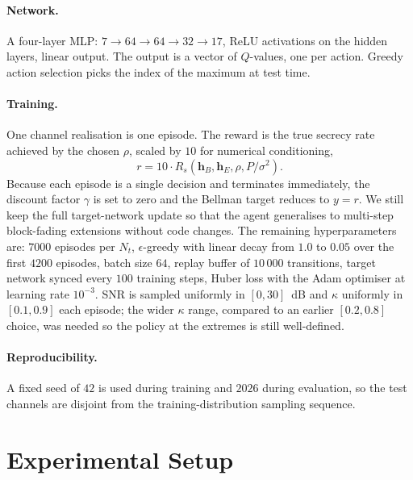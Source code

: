 \documentclass[conference]{IEEEtran}
\begin{document}
\paragraph{Network.} A four-layer MLP:
$7 \to 64 \to 64 \to 32 \to 17$, ReLU activations on the hidden
layers, linear output. The output is a vector of $Q$-values, one per
action. Greedy action selection picks the index of the maximum at
test time.

\paragraph{Training.} One channel realisation is one episode. The
reward is the true secrecy rate achieved by the chosen $\rho$, scaled
by $10$ for numerical conditioning,
\begin{equation}
r = 10 \cdot R_s(\mathbf{h}_B, \mathbf{h}_E, \rho, P/\sigma^2).
\end{equation}
Because each episode is a single decision and terminates immediately,
the discount factor $\gamma$ is set to zero and the Bellman target
reduces to $y = r$. We still keep the full target-network update so
that the agent generalises to multi-step block-fading extensions
without code changes. The remaining hyperparameters are: $7000$
episodes per $N_t$, $\epsilon$-greedy with linear decay from $1.0$ to
$0.05$ over the first $4200$ episodes, batch size $64$, replay buffer
of $10\,000$ transitions, target network synced every $100$ training
steps, Huber loss with the Adam optimiser at learning rate $10^{-3}$.
SNR is sampled uniformly in $[0, 30]$~dB and $\kappa$ uniformly in
$[0.1, 0.9]$ each episode; the wider $\kappa$ range, compared to an
earlier $[0.2, 0.8]$ choice, was needed so the policy at the extremes
is still well-defined.

\paragraph{Reproducibility.} A fixed seed of $42$ is used during
training and $2026$ during evaluation, so the test channels are
disjoint from the training-distribution sampling sequence.

\section{Experimental Setup}\label{sec:setup}
\end{document}
